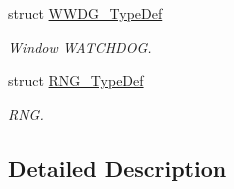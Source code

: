 \begin{DoxyCompactItemize}
struct \mbox{\hyperlink{struct_w_w_d_g___type_def}{W\+W\+D\+G\+\_\+\+Type\+Def}}
\begin{DoxyCompactList}\small\item\em Window W\+A\+T\+C\+H\+D\+OG. \end{DoxyCompactList}\item 
struct \mbox{\hyperlink{struct_r_n_g___type_def}{R\+N\+G\+\_\+\+Type\+Def}}
\begin{DoxyCompactList}\small\item\em R\+NG. \end{DoxyCompactList}\end{DoxyCompactItemize}


\subsection{Detailed Description}
